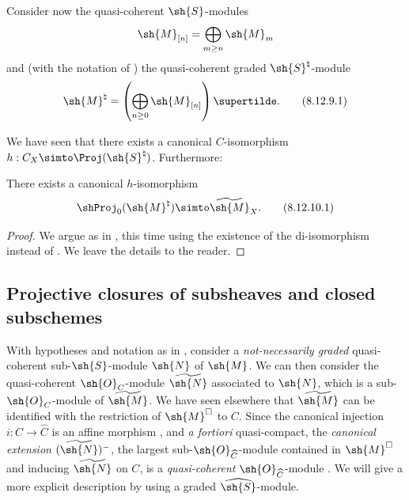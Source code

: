 \begin{env}[8.12.9]
\label{II.8.12.9}
Consider now the quasi-coherent $\sh{S}$-modules
\[
    \sh{M}_{[n]}=\bigoplus_{m\geq n}\sh{M}_m
\]
and (with the notation of ) the quasi-coherent graded $\sh{S}^\natural$-module
\[
\label{II.8.12.9.1}
    \sh{M}^\natural=\left(\bigoplus_{n\geq0}\sh{M}_{[n]}\right)\supertilde.
\tag{8.12.9.1}
\]

We have seen  that there exists a canonical $C$-isomorphism $h:C_X\simto\Proj(\sh{S}^\natural)$.
Furthermore:
\end{env}

\begin{proposition}[8.12.10]
\label{II.8.12.10}
There exists a canonical $h$-isomorphism
\[
\label{II.8.12.10.1}
    \shProj_0(\sh{M}^\natural) \simto \widetilde{\sh{M}}_X.
\tag{8.12.10.1}
\]
\end{proposition}

\begin{proof}
We argue as in , this time using the existence of the di-isomorphism  instead of .
We leave the details to the reader.
\end{proof}


\subsection{Projective closures of subsheaves and closed subschemes}
\label{subsection:II.8.13}

\begin{env}[8.13.1]
\label{II.8.13.1}
With hypotheses and notation as in , consider a \emph{not-necessarily graded} quasi-coherent sub-$\sh{S}$-module $\sh{N}$ of $\sh{M}$.
We can then consider the quasi-coherent $\sh{O}_C$-module $\widetilde{\sh{N}}$ associated to $\sh{N}$, which is a sub-$\sh{O}_C$-module of $\widetilde{\sh{M}}$.
We have seen elsewhere  that $\widetilde{\sh{M}}$ can be identified with the restriction of $\sh{M}^\square$ to $C$.
Since the canonical injection $i:C\to\widehat{C}$ is an affine morphism , and \emph{a fortiori} quasi-compact, the \emph{canonical extension} $(\widetilde{\sh{N}})^-$, the largest sub-$\sh{O}_{\widehat{C}}$-module contained in $\sh{M}^\square$ and inducing $\widetilde{\sh{N}}$ on $C$, is a \emph{quasi-coherent} $\sh{O}_{\widehat{C}}$-module .
We will give a more explicit description by using a graded $\widehat{\sh{S}}$-module.
\end{env}

